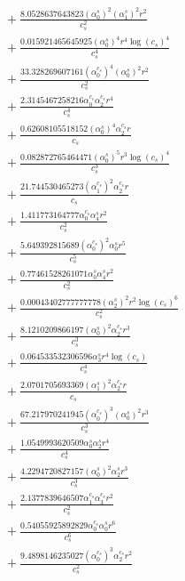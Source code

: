 \documentclass[10pt]{article}
\begin{document}
\begin{align*}
&{}  + \frac{8.0528637643823 \left(\alpha_{0}^s\right)^{2} \left(\alpha_{1}^s\right)^{2} r^{2}}{c_{s}^{2}} \\
&{}  + \frac{0.015921465645925 \left(\alpha_{0}^s\right)^{4} r^{4} \log{\left(c_{s} \right)}^{4}}{c_{s}^{4}} \\
&{}  + \frac{33.328269607161 \left(\alpha_{0}^{c_s}\right)^{4} \left(\alpha_{0}^s\right)^{2} r^{2}}{c_{s}^{2}} \\
&{}  + \frac{2.3145467258216 \alpha_{0}^{c_s} \alpha_{2}^{c_s} r^{4}}{c_{s}^{4}} \\
&{}  + \frac{0.62608105518152 \left(\alpha_{0}^s\right)^{4} \alpha_{2}^{c_s} r}{c_{s}} \\
&{}  + \frac{0.082872765464471 \left(\alpha_{0}^s\right)^{5} r^{3} \log{\left(c_{s} \right)}^{4}}{c_{s}^{3}} \\
&{}  + \frac{21.744530465273 \left(\alpha_{1}^{c_s}\right)^{2} \alpha_{2}^{c_s} r}{c_{s}} \\
&{}  + \frac{1.411773164777 \alpha_{0}^{c_s} \alpha_{4}^s r^{2}}{c_{s}^{2}} \\
&{}  + \frac{5.649392815689 \left(\alpha_{0}^{c_s}\right)^{2} \alpha_{0}^s r^{5}}{c_{s}^{5}} \\
&{}  + \frac{0.77461528261071 \alpha_{0}^s \alpha_{4}^s r^{2}}{c_{s}^{2}} \\
&{}  + \frac{0.00043402777777778 \left(\alpha_{2}^s\right)^{2} r^{2} \log{\left(c_{s} \right)}^{6}}{c_{s}^{2}} \\
&{}  + \frac{8.1210209866197 \left(\alpha_{0}^s\right)^{2} \alpha_{2}^{c_s} r^{3}}{c_{s}^{3}} \\
&{}  + \frac{0.064533532306596 \alpha_{3}^s r^{4} \log{\left(c_{s} \right)}}{c_{s}^{4}} \\
&{}  + \frac{2.0701705693369 \left(\alpha_{1}^s\right)^{2} \alpha_{2}^{c_s} r}{c_{s}} \\
&{}  + \frac{67.217970241945 \left(\alpha_{0}^{c_s}\right)^{3} \left(\alpha_{0}^s\right)^{2} r^{3}}{c_{s}^{3}} \\
&{}  + \frac{1.0549993620509 \alpha_{0}^s \alpha_{2}^s r^{4}}{c_{s}^{4}} \\
&{}  + \frac{4.2294720827157 \left(\alpha_{0}^s\right)^{2} \alpha_{2}^s r^{3}}{c_{s}^{3}} \\
&{}  + \frac{2.1377839646507 \alpha_{1}^{c_s} \alpha_{3}^{c_s} r^{2}}{c_{s}^{2}} \\
&{}  + \frac{0.54055925892829 \alpha_{0}^{c_s} \alpha_{0}^s r^{6}}{c_{s}^{6}} \\
&{}  + \frac{9.4898146235027 \left(\alpha_{0}^{c_s}\right)^{3} \alpha_{2}^{c_s} r^{2}}{c_{s}^{2}} \\

\end{align*}
\end{document}
